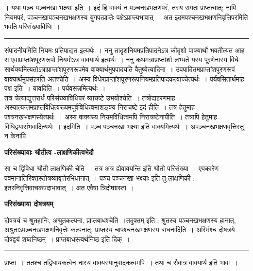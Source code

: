 \documentclass[11pt, openany]{book}
\makeatletter
\def\blfootnote{\gdef\@thefnmark{}\@footnotetext}
\makeatother
\begin{document}
{। यथा {\qtl पञ्च पञ्चनखा भक्ष्याः} इति~। इदं हि वाक्यं न पञ्चनखभक्षणपरं, तस्य रागतः प्राप्तत्वात्; नापि नियमपरं, पञ्चनखापञ्चनखभक्षणस्य युगपत्प्राप्तेः पक्षेऽप्राप्त्यभावात्~। अत इदमपश्चनखभक्षणनिवृत्तिपरमिति भवति परिसंख्याविधिः~।\\}
\hrule
\vspace{3mm}
\noindent
संपादनीयमिति नियमः प्रतिपाद्यत इत्यर्थः~। {\br ननु} तादृशनियमप्रतिपादनेऽत्र कीदृशो वाक्यार्थो भवतीत्यत आह स एवाप्राप्तांशपूरणरूपो नियमोऽत्र वाक्यार्थ इत्यर्थः~। {\br ननु} कथमत्राप्राप्तांशो लभ्यते यस्य पूरणेनास्य विधेः सार्थक्यमित्यतोऽत्राप्राप्तांशपूरणरूपमेव वाक्यार्थमुपपादयति {\br वैतुष्येत्यादिना~।} उपपादितमप्राप्तांशपूरणरूपं वाक्यार्थमुपसंहरति {\br अतश्चेति~।} अस्य विधेरप्राप्तांशपूरणरूपनियमप्रतिपादकत्वाच्चेत्यर्थः~। पर्यवसितार्थमाह\textendash 
{\br पक्ष इति~। यावदिति~।} पर्यवसन्नमित्यर्थः~।\\

तत्र चेत्याद्युत्तरार्धं परिसंख्याविधिपरं व्याचष्टे {\br उभयोश्चेति~।} तत्रोदाहरणमाह अस्यात्यन्तमप्राप्तविधित्वरूपमपूर्वविधित्वमाशङ्क्य निराचष्टे {\br इदं हीति~।} तत्र हेतुमाह पश्चनखभक्षणस्येत्यर्थः~। अस्य वाक्यस्य नियमविधित्वमपि निराचष्टे{\br नापीति~।} तत्रापि हेतुमाह विधिद्वयासंभवादित्यर्थः~। {\br इदमिति~।} पञ्च  पञ्चनखा भक्ष्या इति वाक्यमित्यर्थः~। अपञ्चनखभक्षणवृत्तिस्तु न केनापि 
\blfootnote{पाठा०\textemdash\ $^{१}$वघातविधानम्.}
\newpage
\fancyhead[LO]{[परिसं० दोषत्रयम् ]}
\begin{center}
 \textbf{परिसंख्यायाः श्रौतीत्व -लाक्षणिकीत्वभेदौ}
\end{center}
 
{\bl सा च द्विविधा  {\al श्रौती लाक्षणिकी } चेति~। तत्र {\qtl अत्र ह्येवावयन्ति}  इति श्रौती परिसंख्या~। एवकारेण पवमानातिरिक्तस्तोत्रव्यावृत्तेरभिधानात्~। {\qtl पञ्च पञ्चनखा भक्ष्याः} इति तु लाक्षणिकी ; इतरनिवृत्तिवाचकपदाभावात्~। अत एवैषा त्रिदोषग्रस्ता~।~}
\begin{center}
 \textbf{परिसंख्याया दोषत्रयम् }   
\end{center}
 
{\bl दोषत्रयं च  {\qtl श्रुतहानिः, अश्रुतकल्पना, प्राप्तबाधश्चेति~}।तदुक्तम् इति ; श्रुतस्य पञ्चनखभक्षणस्य हानात्, अश्रुताऽपञ्चनखभक्षणनिवृत्तेः कल्पनात्, प्राप्तस्य  चापश्चनखभक्षणस्य बाधनादिति~। अस्मिंश्च दोषत्रये 
दोषद्वयं शब्दनिष्ठम्~। प्राप्तबाधस्त्वर्थनिष्ठ इति दिक्~।~}\\
\hrule
\vspace{3mm}
\noindent
प्राप्ता~। ततश्च तद्विधायकत्वेन नास्य वाक्यस्यानुवादकत्वमपि~। तथा च सैवात्र वाक्यार्थ इति भावः~।~\\
\end{document}
